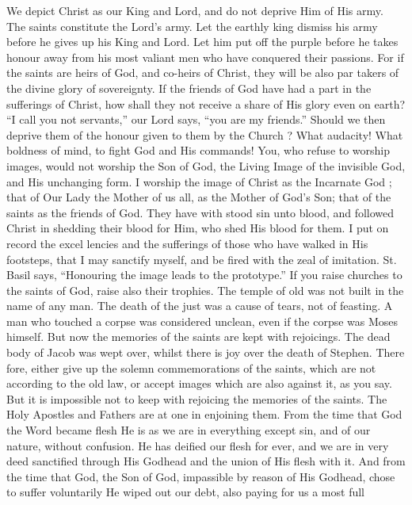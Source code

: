\documentclass[10pt]{book}
\begin{document}
\begin{paracol}{2}
We depict Christ as our King and Lord, 
and do not deprive Him of His army. The 
saints constitute the Lord's army. Let the 
earthly king dismiss his army before he gives 
up his King and Lord. Let him put off the 
purple before he takes honour away from his 
most valiant men who have conquered their 
passions. For if the saints are heirs of God, 
and co-heirs of Christ, they will be also par 
takers of the divine glory of sovereignty. If 
the friends of God have had a part in the 
sufferings of Christ, how shall they not receive 
a share of His glory even on earth? ``I call 
you not servants,'' our Lord says, ``you are my 
friends.'' Should we then deprive them of the 
honour given to them by the Church ? What 
audacity! What boldness of mind, to fight God 
and His commands! You, who refuse to 
worship images, would not worship the Son of 
God, the Living Image of the invisible God, 
and His unchanging form. I worship the 
image of Christ as the Incarnate God ; that 
of Our Lady the Mother of us 
all, as the Mother of God's Son; that of the 
saints as the friends of God. They have with 
stood sin unto blood, and followed Christ in 
shedding their blood for Him, who shed His 
blood for them. I put on record the excel 
lencies and the sufferings of those who have 
walked in His footsteps, that I may sanctify 
myself, and be fired with the zeal of imitation. 
St. Basil says, ``Honouring the image leads to 
the prototype.'' If you raise churches to the 
saints of God, raise also their trophies. The 
temple of old was not built in the name of 
any man. The death of the just was a cause 
of tears, not of feasting. A man who touched 
a corpse was considered unclean, even if the 
corpse was Moses himself. But now the 
memories of the saints are kept with rejoicings. 
The dead body of Jacob was wept over, whilst 
there is joy over the death of Stephen. There 
fore, either give up the solemn commemorations of the saints, which are not according 
to the old law, or accept images which are 
also against it, as you say. But it is impossible 
not to keep with rejoicing the memories of the 
saints. The Holy Apostles and Fathers are at 
one in enjoining them. From the time that 
God the Word became flesh He is as we are 
in everything except sin, and of our nature, 
without confusion. He has deified our flesh 
for ever, and we are in very deed sanctified 
through His Godhead and the union of His 
flesh with it. And from the time that God, 
the Son of God, impassible by reason of His 
Godhead, chose to suffer voluntarily He wiped 
out our debt, also paying for us a most full 

\end{paracol}
\end{document}
